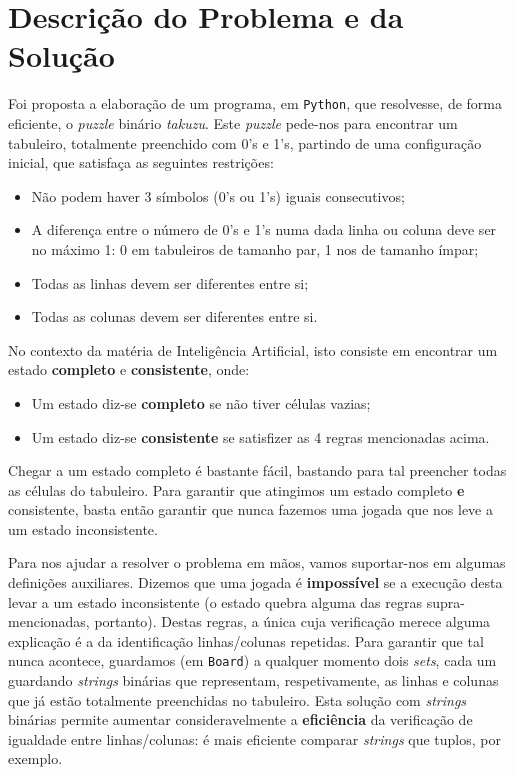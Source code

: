 \documentclass[12pt,a4paper]{article}
\begin{document}
\section*{Descrição do Problema e da Solução}

Foi proposta a elaboração de um programa, em \texttt{Python}, que resolvesse, de
forma eficiente, o \textit{puzzle} binário \textit{takuzu}.
Este \textit{puzzle} pede-nos para encontrar um tabuleiro, totalmente preenchido
com 0's e 1's, partindo de uma configuração inicial, que satisfaça as seguintes restrições:
\begin{itemize}
      \item Não podem haver 3 símbolos (0's ou 1's) iguais consecutivos;
      \item A diferença entre o número de 0's e 1's numa dada linha ou coluna deve
            ser no máximo 1: 0 em tabuleiros de tamanho par, 1 nos de tamanho ímpar;
      \item Todas as linhas devem ser diferentes entre si;
      \item Todas as colunas devem ser diferentes entre si.
\end{itemize}

No contexto da matéria de Inteligência Artificial, isto consiste em encontrar um
estado \textbf{completo} e \textbf{consistente}, onde:
\begin{itemize}
      \item Um estado diz-se \textbf{completo} se não tiver células vazias;
      \item Um estado diz-se \textbf{consistente} se satisfizer as 4 regras mencionadas acima.
\end{itemize}

Chegar a um estado completo é bastante fácil, bastando para tal preencher todas as células do tabuleiro.
Para garantir que atingimos um estado completo \textbf{e} consistente, basta então
garantir que nunca fazemos uma jogada que nos leve a um estado inconsistente.

Para nos ajudar a resolver o problema em mãos, vamos suportar-nos em algumas definições auxiliares.
Dizemos que uma jogada é \textbf{impossível} se a execução desta levar a um estado
inconsistente (o estado quebra alguma das regras supra-mencionadas, portanto).
Destas regras, a única cuja verificação merece alguma explicação é a da identificação
linhas/colunas repetidas.
Para garantir que tal nunca acontece, guardamos (em \texttt{Board}) a qualquer momento
dois \textit{sets}, cada um guardando \textit{strings} binárias que representam,
respetivamente, as linhas e colunas que já estão totalmente preenchidas no tabuleiro.
Esta solução com \textit{strings} binárias permite aumentar consideravelmente a
\textbf{eficiência} da verificação de igualdade entre linhas/colunas: é mais eficiente
comparar \textit{strings} que tuplos, por exemplo.
\end{document}
